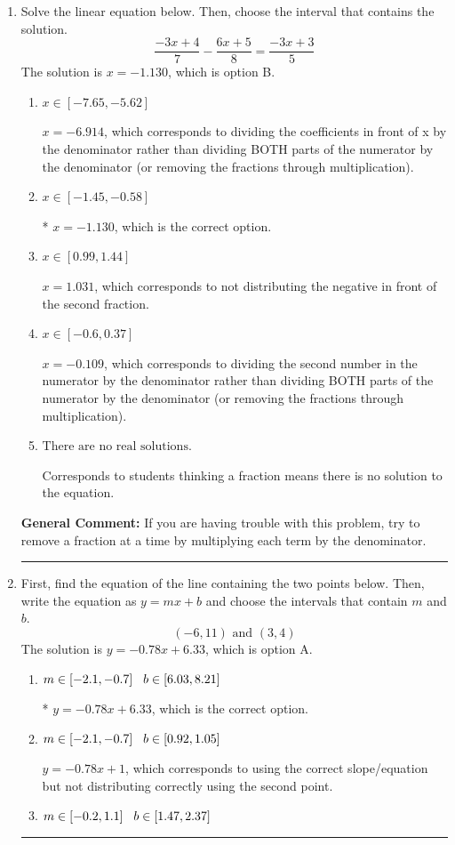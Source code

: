 \documentclass{extbook}[14pt]
\newcommand{\litem}[1]{\item #1

\rule{\textwidth}{0.4pt}}
\begin{document}
\begin{enumerate}\litem{
Solve the linear equation below. Then, choose the interval that contains the solution.
\[ \frac{-3x + 4}{7} - \frac{6x + 5}{8} = \frac{-3x + 3}{5} \]
The solution is \( x = -1.130 \), which is option B.\begin{enumerate}[label=\Alph*.]
\item \( x \in [-7.65, -5.62] \)

 $x = -6.914$, which corresponds to dividing the coefficients in front of x by the denominator rather than dividing BOTH parts of the numerator by the denominator (or removing the fractions through multiplication).
\item \( x \in [-1.45, -0.58] \)

* $x = -1.130$, which is the correct option.
\item \( x \in [0.99, 1.44] \)

 $x = 1.031$, which corresponds to not distributing the negative in front of the second fraction.
\item \( x \in [-0.6, 0.37] \)

 $x = -0.109$, which corresponds to dividing the second number in the numerator by the denominator rather than dividing BOTH parts of the numerator by the denominator (or removing the fractions through multiplication).
\item \( \text{There are no real solutions.} \)

Corresponds to students thinking a fraction means there is no solution to the equation.
\end{enumerate}

\textbf{General Comment:} If you are having trouble with this problem, try to remove a fraction at a time by multiplying each term by the denominator.
}
\litem{
First, find the equation of the line containing the two points below. Then, write the equation as $ y=mx+b $ and choose the intervals that contain $m$ and $b$.
\[ (-6, 11) \text{ and } (3, 4) \]
The solution is \( y = -0.78x + 6.33 \), which is option A.\begin{enumerate}[label=\Alph*.]
\item \( m \in [-2.1, -0.7] \hspace*{3mm} b \in [6.03, 8.21] \)

* $y = -0.78x + 6.33$, which is the correct option.
\item \( m \in [-2.1, -0.7] \hspace*{3mm} b \in [0.92, 1.05] \)

 $y = -0.78x + 1$, which corresponds to using the correct slope/equation but not distributing correctly using the second point.
\item \( m \in [-0.2, 1.1] \hspace*{3mm} b \in [1.47, 2.37] \)


\end{enumerate}}
\end{enumerate}
\end{document}
